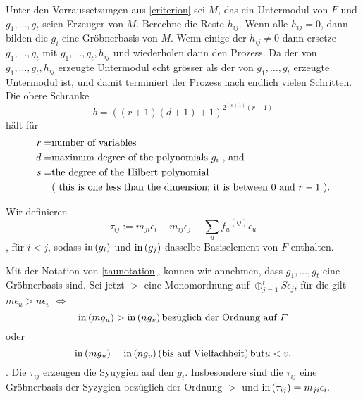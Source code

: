 \documentclass{article}
\begin{document}
\begin{algo}
	Unter den Vorraussetzungen aus \ref{criterion} 
	sei
	\( M \),
	das ein Untermodul von
	\( F \)
	und 
	\( g_{1},\dots,g_{t}\)
	seien  Erzeuger von 
	\( M \).
	Berechne die Reste
	\( h_{ij} \).
	Wenn alle 
	\( h_{ij} = 0 \),
	dann bilden die 
	\(g_{i} \)
	eine Gr\"obnerbasis von 
	\( M \).
	Wenn einige der 
	\( h_{ij} \neq 0 \)
	dann ersetze 
	\( g_{1},\dots,g_{t}\)
	mit 
	\( g_{1},\dots,g_{t},h_{ij} \)
	und wiederholen dann den Prozess.
	Da der von
	\( g_{1},\dots,g_{t},h_{ij} \)
	erzeugte Untermodul echt gr\"osser als der von
	\( g_{1},\dots,g_{t}\)
	erzeugte Untermodul ist, 
	und damit terminiert der Prozess nach endlich vielen Schritten.
	Die obere Schranke 
	\[
		b=\left( 
			\left( r+1 \right)
			\left( d+1 \right)+1 
		\right)^{2^{(s+1)}(r+1) }
	\]	
	h\"alt f\"ur
	\begin{align*}	
		r = &\text{number of variables} \\
		d = &\text{maximum degree of the polynomials \( g_i\) , and } \\
		s = &\text{the degree of the Hilbert polynomial } \\
		    &\text{( this is one less than the dimension; it is between \( 0 \) and \(r-1\) ).}
	\end{align*}

\end{algo}
        \begin{defn}
                Wir definieren
                \[
                        \tau_{ij}:=
                        m_{ji}\epsilon_{i} - 
                        m_{ij} \epsilon_{j} - 
                        \sum_{u} {f_{u}}^{\left( ij \right) } 
                        \epsilon_{u} 
                \],
                f\"ur
                \( i < j \),
                sodass
                \( \operatorname{in} \left( g_{i}  \right) \)
                und
                \( \operatorname{in} \left( g_{j}  \right) \)
                dasselbe Basiselement von \( F \)
                enthalten.
        \end{defn}


\begin{thm}[Schreyer \cite{Eis1}[15.10]
	Mit der Notation von \ref{taunotation}, 
	konnen wir annehmen,
	dass
	\( g_1,\dots,g_t\)
	eine Gr\"obnerbasis sind.
	Sei jetzt 
	\( > \) 
	eine Monomordnung auf 
	\( \oplus_{j=1}^t S \epsilon_{j} \),
	f\"ur die gilt
	\( m \epsilon_{u} > n \epsilon_{v} \)
	\(\iff\)
	\[
		\operatorname{in}\left(  m g_{u} \right) > \operatorname{in}\left( n g_{v} \right) 
		\text{bez\"uglich der Ordnung auf } F 
	\]
	oder
	\[
		\operatorname{in}\left( m g_{u} \right) = \operatorname{in}\left( n g_{v} \right) 
		\left( \text{bis auf Vielfachheit} \right) \text{but} u < v.
	\].
	Die
	\( \tau_{ij} \) 
	erzeugen die Syuygien auf den
	\( g_{i} \).
	Insbesondere sind die
	\( \tau_{ij} \)
	eine Gr\"obnerbasis der Syzygien bez\"uglich der Ordnung
	\( > \)
	und 
	\( \operatorname{in}\left( \tau_{ij} \right) = m_{ji}\epsilon_{i}.\)
\end{thm}


\end{document}
